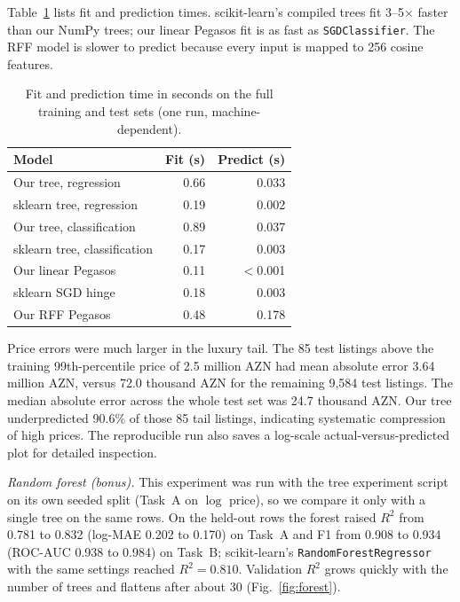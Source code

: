\documentclass[10pt,twocolumn,a4paper]{article}
\begin{document}
Table~\ref{tab:time} lists fit and prediction times. scikit-learn's
compiled trees fit 3--5$\times$ faster than our NumPy trees; our linear
Pegasos fit is as fast as \texttt{SGDClassifier}. The RFF model is
slower to predict because every input is mapped to 256 cosine features.

\begin{table}[t]
  \centering
  \caption{Fit and prediction time in seconds on the full training and
  test sets (one run, machine-dependent).}
  \label{tab:time}
  \small
  \begin{tabular}{@{}lrr@{}}
    \toprule
    Model & Fit (s) & Predict (s) \\
    \midrule
    Our tree, regression & 0.66 & 0.033 \\
    sklearn tree, regression & 0.19 & 0.002 \\
    Our tree, classification & 0.89 & 0.037 \\
    sklearn tree, classification & 0.17 & 0.003 \\
    Our linear Pegasos & 0.11 & $<$0.001 \\
    sklearn SGD hinge & 0.18 & 0.003 \\
    Our RFF Pegasos & 0.48 & 0.178 \\
    \bottomrule
  \end{tabular}
\end{table}

Price errors were much larger in the luxury tail. The 85 test listings
above the training 99th-percentile price of 2.5 million AZN had mean
absolute error 3.64 million AZN, versus 72.0 thousand AZN for the
remaining 9,584 test listings. The median absolute error across the
whole test set was 24.7 thousand AZN. Our tree underpredicted 90.6\%
of those 85 tail listings, indicating systematic compression of high
prices. The reproducible run also saves a log-scale actual-versus-predicted
plot for detailed inspection.

\emph{Random forest (bonus).} This experiment was run with the tree
experiment script on its own seeded split (Task~A on $\log$ price), so
we compare it only with a single tree on the same rows. On the held-out
rows the forest raised $R^2$ from 0.781 to 0.832 (log-MAE 0.202 to
0.170) on Task~A and F1 from 0.908 to 0.934 (ROC-AUC 0.938 to 0.984) on
Task~B; scikit-learn's \texttt{RandomForestRegressor} with the same
settings reached $R^2=0.810$. Validation $R^2$ grows quickly with the
number of trees and flattens after about 30 (Fig.~\ref{fig:forest}).
\end{document}
